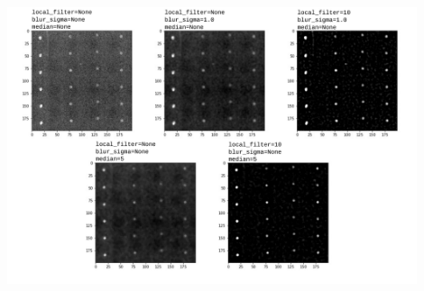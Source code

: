 \documentclass[10pt,a4paper]{article}
\begin{document}
\begin{center}
{\begin{minipage}[c][][c]{0.95\textwidth}
		 \vspace{.2cm}
		  
	\begin{center}
		\includegraphics[width=0.9\textwidth]{filters_effect.pdf}
	\end{center}

		 \vspace{.1cm}
		  
	\end{minipage}
}

\end{center}
\end{document}
